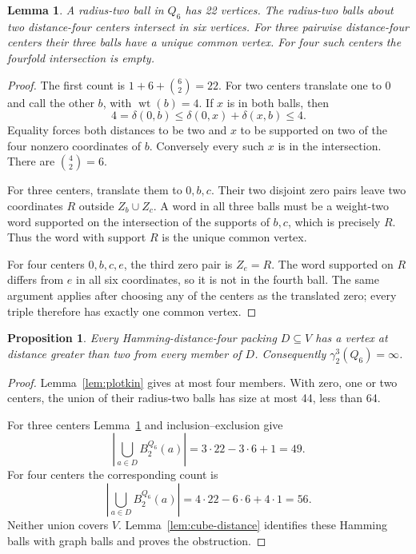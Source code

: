 \documentclass[11pt]{article}
\newtheorem{lemma}[theorem]{Lemma}
\newtheorem{proposition}[theorem]{Proposition}
\theoremstyle{definition}
\theoremstyle{remark}
\newcommand{\wt}{\operatorname{wt}}
\begin{document}
\begin{lemma}\label{lem:ball-intersections}
A radius-two ball in \(Q_6\) has 22 vertices. The radius-two balls
about two distance-four centers intersect in six vertices. For three
pairwise distance-four centers their three balls have a unique common
vertex. For four such centers the fourfold intersection is empty.
\end{lemma}
\begin{proof}
The first count is \(1+6+\binom62=22\). For two centers translate one
to \(0\) and call the other \(b\), with \(\wt(b)=4\). If \(x\) is in
both balls, then
\[
 4=\delta(0,b)\le\delta(0,x)+\delta(x,b)\le4.
\]
Equality forces both distances to be two and \(x\) to be supported
on two of the four nonzero coordinates of \(b\). Conversely every
such \(x\) is in the intersection. There are \(\binom42=6\).

For three centers, translate them to \(0,b,c\). Their two disjoint
zero pairs leave two coordinates \(R\) outside \(Z_b\cup Z_c\).
A word in all three balls must be a weight-two word supported on
the intersection of the supports of \(b,c\), which is precisely \(R\).
Thus the word with support \(R\) is the unique common vertex.

For four centers \(0,b,c,e\), the third zero pair is \(Z_e=R\).
The word supported on \(R\) differs from \(e\) in all six coordinates,
so it is not in the fourth ball. The same argument applies after
choosing any of the centers as the translated zero; every triple
therefore has exactly one common vertex.
\end{proof}

\begin{proposition}\label{prop:factor}
Every Hamming-distance-four packing \(D\subseteq V\) has a vertex
at distance greater than two from every member of \(D\).
Consequently \(\gamma_2^3(Q_6)=\infty\).
\end{proposition}
\begin{proof}
Lemma~\ref{lem:plotkin} gives at most four members. With zero, one
or two centers, the union of their radius-two balls has size at most
44, less than 64.

For three centers Lemma~\ref{lem:ball-intersections} and
inclusion--exclusion give
\[
 \left|\bigcup_{a\in D}B_2^{Q_6}(a)\right|
       =3\cdot22-3\cdot6+1=49.
\]
For four centers the corresponding count is
\[
 \left|\bigcup_{a\in D}B_2^{Q_6}(a)\right|
       =4\cdot22-6\cdot6+4\cdot1=56.
\]
Neither union covers \(V\). Lemma~\ref{lem:cube-distance} identifies
these Hamming balls with graph balls and proves the obstruction.
\end{proof}
\end{document}
